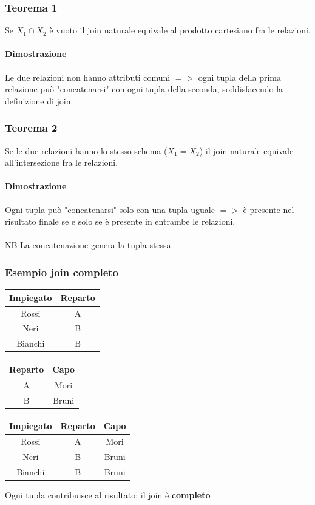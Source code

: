 \documentclass[../main.tex]{subfiles}
\begin{document}
	\subsubsection{Teorema 1}
	Se $X_1 \cap X_2$ è vuoto il join naturale equivale al prodotto cartesiano fra le relazioni.
	\paragraph{Dimostrazione}
	Le due relazioni non hanno attributi comuni $=>$ ogni tupla della prima relazione può "concatenarsi" con ogni tupla della seconda, soddisfacendo la definizione di join.
	\subsubsection{Teorema 2}
	Se le due relazioni hanno lo stesso schema ($X_1 = X_2$) il join naturale equivale all'intersezione fra le relazioni.
	\paragraph{Dimostrazione}
	Ogni tupla può "concatenarsi" solo con una tupla uguale $=>$ è presente nel risultato finale se e solo se è presente in entrambe le relazioni.\\\\
	NB La concatenazione genera la tupla stessa.
	\subsubsection{Esempio join completo}
	\begin{center}
		\begin{tabular}{ |c|c| }
			\hline
			\textbf{Impiegato} & \textbf{Reparto}\\
			\hline
			Rossi & A\\
			Neri & B\\
			Bianchi & B\\
			\hline
		\end{tabular}
		\begin{tabular}{ |c|c| }
			\hline
			\textbf{Reparto} & \textbf{Capo}\\
			\hline
			A & Mori \\
			B & Bruni \\
			\hline
		\end{tabular}
	\end{center}
	\begin{center}
		\begin{tabular}{ |c|c|c| }
			\hline
			\textbf{Impiegato} & \textbf{Reparto} & \textbf{Capo}\\
			\hline
			Rossi & A & Mori\\
			Neri & B & Bruni\\
			Bianchi & B & Bruni\\
			\hline
		\end{tabular}
	\end{center}
	Ogni tupla contribuisce al risultato: il join è \textbf{completo}
\end{document}
